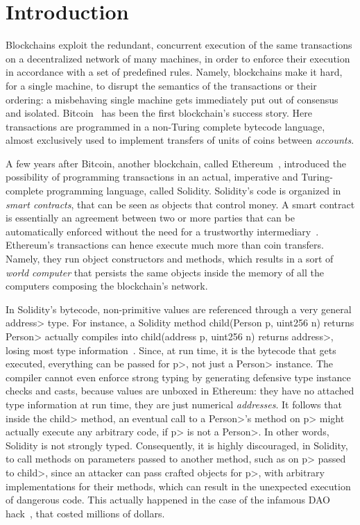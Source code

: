 \section{Introduction}\label{sec:introduction}

Blockchains exploit the redundant, concurrent execution of the same
transactions on a decentralized network of many machines,
in order to enforce their execution in accordance with
a set of predefined rules. Namely, blockchains make it hard, for a single machine,
to disrupt the semantics of the transactions or their ordering: a misbehaving single machine
gets immediately put out of consensus and isolated. Bitcoin~\cite{Nakamoto08,book-mastering-bitcoin}
has been the first blockchain's success story. Here
transactions are programmed in a non-Turing complete bytecode language,
almost exclusively used to implement transfers of units of coins between \emph{accounts}.

A few years after Bitcoin, another blockchain, called
Ethereum~\cite{Buterin13,AntonopoulosW18}, introduced the possibility of programming
transactions in an actual, imperative and Turing-complete programming language, called Solidity.
Solidity's code is organized in \emph{smart contracts}, that can be seen as
objects that control money. A smart contract is essentially an agreement between two or more parties that can be automatically enforced without the need for a trustworthy intermediary~\cite{ebp}.
Ethereum's transactions can hence execute much more than coin transfers. Namely,
they run object constructors and methods, which results in a sort
of \emph{world computer} that persists the same objects inside the memory of all the
computers composing the blockchain's network.

In Solidity's bytecode,
non-primitive values are referenced through a very general
\<address> type. For instance, a Solidity method
\<child(Person p, uint256 n) returns Person> actually compiles
into \<child(address p, uint256 n) returns address>, losing most
type information~\cite{CrafaPZ19}.
Since, at run time, it is the bytecode that gets executed,
everything can be passed for \<p>, not just a \<Person> instance.
The compiler cannot even enforce strong typing
by generating defensive type instance checks and casts, because
values are unboxed in Ethereum: they have no attached
type information at run time,
they are just numerical \emph{addresses}.
It follows that inside the \<child> method, an eventual call to a \<Person>'s method
on \<p> might actually execute any arbitrary code, if \<p> is not a \<Person>.
In other words, Solidity is not strongly typed.
Consequently, it is highly discouraged, in Solidity, to call methods on parameters passed
to another method, such as on \<p> passed to \<child>, since an attacker can pass crafted
objects for \<p>, with arbitrary implementations for their methods,
which can result in the unexpected execution of
dangerous code. This actually happened in the case of the infamous DAO hack~\cite{dao16}, that
costed millions of dollars.

